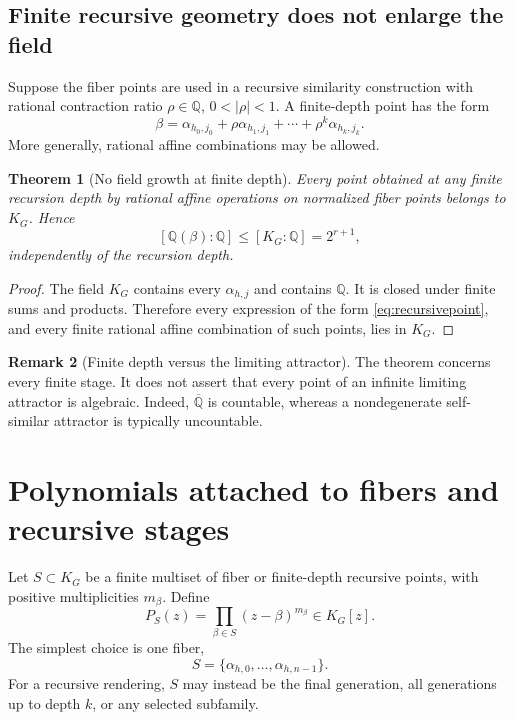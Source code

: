 \documentclass[11pt,a4paper]{article}
\newtheorem{theorem}{Theorem}[section]
\theoremstyle{definition}
\newtheorem{remark}[theorem]{Remark}
\newcommand{\Q}{\mathbb{Q}}
\begin{document}
\subsection{Finite recursive geometry does not enlarge the field}

Suppose the fiber points are used in a recursive similarity construction with rational contraction ratio $\rho\in\Q$, $0<|\rho|<1$.  A finite-depth point has the form
\begin{equation}
\label{eq:recursivepoint}
\beta=\alpha_{h_0,j_0}+\rho\alpha_{h_1,j_1}+\cdots+\rho^k\alpha_{h_k,j_k}.
\end{equation}
More generally, rational affine combinations may be allowed.

\begin{theorem}[No field growth at finite depth]
\label{thm:nofieldgrowth}
Every point obtained at any finite recursion depth by rational affine operations on normalized fiber points belongs to $K_G$.  Hence
\[
[\Q(\beta):\Q]\le [K_G:\Q]=2^{r+1},
\]
independently of the recursion depth.
\end{theorem}

\begin{proof}
The field $K_G$ contains every $\alpha_{h,j}$ and contains $\Q$.  It is closed under finite sums and products.  Therefore every expression of the form \eqref{eq:recursivepoint}, and every finite rational affine combination of such points, lies in $K_G$.
\end{proof}

\begin{remark}[Finite depth versus the limiting attractor]
The theorem concerns every finite stage.  It does not assert that every point of an infinite limiting attractor is algebraic.  Indeed, $\overline{\Q}$ is countable, whereas a nondegenerate self-similar attractor is typically uncountable.
\end{remark}

\section{Polynomials attached to fibers and recursive stages}

Let $S\subset K_G$ be a finite multiset of fiber or finite-depth recursive points, with positive multiplicities $m_\beta$.  Define
\begin{equation}
\label{eq:poly}
P_S(z)=\prod_{\beta\in S}(z-\beta)^{m_\beta}\in K_G[z].
\end{equation}
The simplest choice is one fiber,
\[
S=\{\alpha_{h,0},\ldots,\alpha_{h,n-1}\}.
\]
For a recursive rendering, $S$ may instead be the final generation, all generations up to depth $k$, or any selected subfamily.
\end{document}
